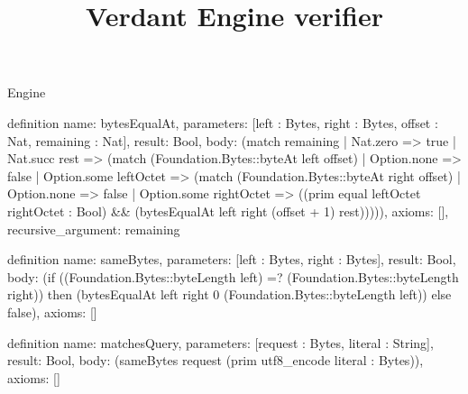 \begin{lexlean}{Engine}
\title{Verdant Engine verifier}
\begin{semanticmodule}
definition{
  name: bytesEqualAt,
  parameters: [left : Bytes, right : Bytes, offset : Nat, remaining : Nat],
  result: Bool,
  body: (match remaining
    | Nat.zero => true
    | Nat.succ rest => (match (Foundation.Bytes::byteAt left offset)
      | Option.none => false
      | Option.some leftOctet => (match (Foundation.Bytes::byteAt right offset)
        | Option.none => false
        | Option.some rightOctet => ((prim equal leftOctet rightOctet : Bool) && (bytesEqualAt left right (offset + 1) rest))))),
  axioms: [],
  recursive_argument: remaining
}

definition{
  name: sameBytes,
  parameters: [left : Bytes, right : Bytes],
  result: Bool,
  body: (if ((Foundation.Bytes::byteLength left) =? (Foundation.Bytes::byteLength right)) then (bytesEqualAt left right 0 (Foundation.Bytes::byteLength left)) else false),
  axioms: []
}

definition{
  name: matchesQuery,
  parameters: [request : Bytes, literal : String],
  result: Bool,
  body: (sameBytes request (prim utf8_encode literal : Bytes)),
  axioms: []
}


\end{semanticmodule}
\end{lexlean}
